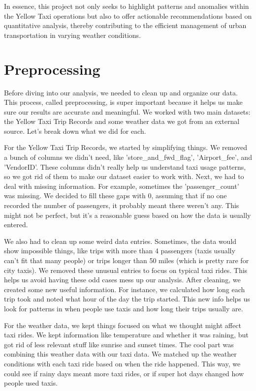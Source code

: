 \documentclass[11pt]{article}
\begin{document}
In essence, this project not only seeks to highlight patterns and anomalies within the Yellow Taxi operations but also to offer actionable recommendations based on quantitative analysis, thereby contributing to the efficient management of urban transportation in varying weather conditions.

\section{Preprocessing}
Before diving into our analysis, we needed to clean up and organize our data. This process, called preprocessing, is super important because it helps us make sure our results are accurate and meaningful. We worked with two main datasets: the Yellow Taxi Trip Records and some weather data we got from an external source. Let's break down what we did for each.

For the Yellow Taxi Trip Records, we started by simplifying things. We removed a bunch of columns we didn't need, like 'store\_and\_fwd\_flag', 'Airport\_fee', and 'VendorID'. These columns didn't really help us understand taxi usage patterns, so we got rid of them to make our dataset easier to work with. Next, we had to deal with missing information. For example, sometimes the 'passenger\_count' was missing. We decided to fill these gaps with 0, assuming that if no one recorded the number of passengers, it probably meant there weren't any. This might not be perfect, but it's a reasonable guess based on how the data is usually entered.

We also had to clean up some weird data entries. Sometimes, the data would show impossible things, like trips with more than 4 passengers (taxis usually can't fit that many people) or trips longer than 50 miles (which is pretty rare for city taxis). We removed these unusual entries to focus on typical taxi rides. This helps us avoid having these odd cases mess up our analysis. After cleaning, we created some new useful information. For instance, we calculated how long each trip took and noted what hour of the day the trip started. This new info helps us look for patterns in when people use taxis and how long their trips usually are.


For the weather data, we kept things focused on what we thought might affect taxi rides. We kept information like temperature and whether it was raining, but got rid of less relevant stuff like sunrise and sunset times. The cool part was combining this weather data with our taxi data. We matched up the weather conditions with each taxi ride based on when the ride happened. This way, we could see if rainy days meant more taxi rides, or if super hot days changed how people used taxis.
\end{document}
